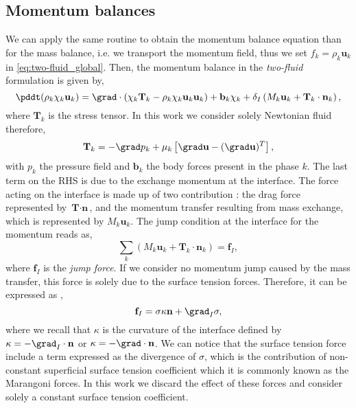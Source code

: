 \subsection{Momentum balances}

We can apply the same routine to obtain the momentum balance equation than for the mass balance, i.e. we transport the momentum field, thus we set $f_k = \rho_k \textbf{u}_k$ in \ref{eq:two-fluid_global}.
Then, the momentum balance in the \textit{two-fluid} formulation is given by,
\begin{equation}
    \pddt (\rho_k \chi_k \textbf{u}_k)
    = \grad \cdot \left(
        \chi_k\textbf{T}_k 
        -\rho_k \chi_k \textbf{u}_k \textbf{u}_k 
    \right) 
    + \textbf{b}_k\chi_k
    +  \delta_I\left(
        M_k \textbf{u}_k
        + \textbf{T}_k \cdot \textbf{n}_k 
    \right),
    \label{eq:two-fuild_momentum}
\end{equation}
where $\textbf{T}_k$ is the stress tensor.
In this work we consider solely Newtonian fluid therefore,
\begin{equation*}
    \textbf{T}_k 
    = -\grad p_k 
    + \mu_k \left[\grad \textbf{u} - (\grad\textbf{u})^T\right],
\end{equation*}
with $p_k$ the pressure field and $\textbf{b}_k$ the body forces present in the phase $k$.
The last term on the RHS is due to the exchange momentum at the interface.
The force acting on the interface is made up of two contribution : the drag force represented by $\textbf{T}\cdot\textbf{n}$, and the momentum transfer resulting from mass exchange, which is represented by $M_k \textbf{u}_k$.
The jump condition at the interface for the momentum reads as, 
\begin{equation*}
    \sum_k \left(
        M_k \textbf{u}_k
        + \textbf{T}_k \cdot \textbf{n}_k
    \right)
    = \textbf{f}_I,
    \label{eq:stressjump}
\end{equation*}
where $\textbf{f}_I$ is the \textit{jump force}. 
If we consider no momentum jump caused by the mass transfer, this force is solely due to the surface tension forces. 
Therefore, it can be expressed as \citep{tryggvason2011direct},  
\begin{equation}
    \textbf{f}_I    
    = \sigma \kappa \textbf{n}
    +\grad_I \sigma,
    \label{eq:f_I}
\end{equation}
where we recall that $\kappa$ is the curvature of the interface defined by $\kappa = -\grad_I\cdot\textbf{n}$ or $\kappa = -\grad\cdot\textbf{n}$. 
We can notice that the surface tension force include a term expressed as the divergence of $\sigma$, which is the contribution of non-constant superficial surface tension coefficient which it is commonly known as the  Marangoni forces.
In this work we discard the effect of these forces and consider solely a constant surface tension coefficient.  

